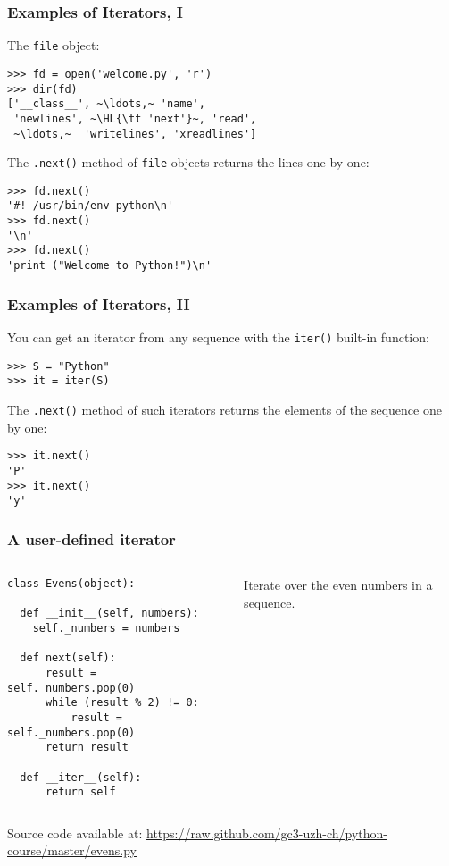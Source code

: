 \documentclass[english,serif,mathserif,xcolor=pdftex,dvipsnames,table]{beamer}
\begin{document}
\begin{frame}[fragile]
  \frametitle{Examples of Iterators, I}

  The \texttt{file} object:
\begin{lstlisting}
>>> fd = open('welcome.py', 'r')
>>> dir(fd)
['__class__', ~\ldots,~ 'name',
 'newlines', ~\HL{\tt 'next'}~, 'read',
 ~\ldots,~  'writelines', 'xreadlines']
\end{lstlisting}

  \+
  The \texttt{.next()} method of \texttt{file} objects returns the
  lines one by one:
\begin{lstlisting}
>>> fd.next()
'#! /usr/bin/env python\n'
>>> fd.next()
'\n'
>>> fd.next()
'print ("Welcome to Python!")\n'
\end{lstlisting}

\end{frame}


\begin{frame}[fragile]
  \frametitle{Examples of Iterators, II}

  You can get an iterator from any sequence with the \texttt{iter()} built-in function:
\begin{lstlisting}
>>> S = "Python"
>>> it = iter(S)
\end{lstlisting}

  \+
  The \texttt{.next()} method of such iterators returns the
  elements of the sequence one by one:
\begin{lstlisting}
>>> it.next()
'P'
>>> it.next()
'y'
\end{lstlisting}
\end{frame}


\begin{frame}[fragile]
  \frametitle{A user-defined iterator}
  \begin{columns}[t]
    \begin{column}{0.5\textwidth}
\begin{lstlisting}
class Evens(object):

  def __init__(self, numbers):
    self._numbers = numbers

  def next(self):
      result = self._numbers.pop(0)
      while (result % 2) != 0:
          result = self._numbers.pop(0)
      return result

  def __iter__(self):
      return self
\end{lstlisting}
    \end{column}
    \begin{column}{0.5\textwidth}
      \raggedleft
      Iterate over the even numbers in a sequence.
    \end{column}
  \end{columns}

  \+
  {\scriptsize Source code available at:
    \url{https://raw.github.com/gc3-uzh-ch/python-course/master/evens.py}}
\end{frame}
\end{document}
